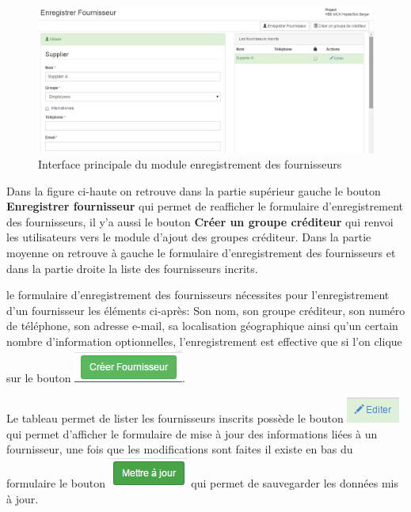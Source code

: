\documentclass[12pt,a4paper]{report}
\begin{document}
\begin{figure}[h]
\begin{center}
\includegraphics[width=14cm]{pic/InterEnrFourn.png}
\end{center}
\caption{Interface principale du module enregistrement des fournisseurs}
\label{Interface principale du module enregistrement des fournisseurs}
\end{figure}

Dans la figure ci-haute on retrouve dans la partie supérieur gauche le bouton \textbf{Enregistrer fournisseur} qui permet de reafficher le formulaire d'enregistrement des fournisseurs, il y'a aussi le bouton \textbf{Créer un groupe créditeur} qui renvoi les utilisateurs vers le module d'ajout des groupes créditeur. Dans la partie moyenne on retrouve à gauche le formulaire d'enregistrement des fournisseurs et dans la partie droite la liste des fournisseurs incrits.

le formulaire d'enregistrement des fournisseurs nécessites pour l'enregistrement d'un fournisseur les éléments ci-après: Son nom, son groupe créditeur, son numéro de téléphone, son adresse e-mail, sa localisation géographique ainsi qu'un certain nombre d'information optionnelles, l'enregistrement est effective que si l'on clique sur le bouton \includegraphics[scale=0.7]{pic/CreatSupplier.png}.

Le tableau permet de lister les fournisseurs inscrits possède le bouton \includegraphics[scale=0.7]{pic/EditSupplier.png} qui permet d'afficher le formulaire de mise à jour des informations liées à un fournisseur, une fois que les modifications sont faites il existe en bas du formulaire le bouton \includegraphics[scale=0.7]{pic/MettreJourSuppl.png} qui permet de sauvegarder les données mis à jour.
\end{document}
